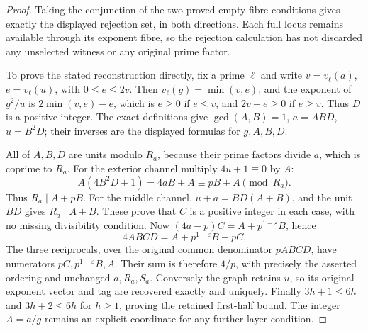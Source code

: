 \begin{proof}
Taking the conjunction of the two proved empty-fibre conditions
gives exactly the displayed rejection set, in both directions.
Each full locus remains available through its exponent fibre,
so the rejection calculation has not discarded any unselected
witness or any original prime factor.

To prove the stated reconstruction directly, fix a prime \(\ell\)
and write \(v=v_\ell(a)\), \(e=v_\ell(u)\), with \(0\le e\le2v\).
Then \(v_\ell(g)=\min(v,e)\), and the exponent of \(g^2/u\)
is \(2\min(v,e)-e\), which is \(e\ge0\) if \(e\le v\),
and \(2v-e\ge0\) if \(e\ge v\). Thus \(D\) is a positive
integer. The exact definitions give \(\gcd(A,B)=1\),
\(a=ABD\), \(u=B^2D\); their inverses are the displayed
formulas for \(g,A,B,D\).

All of \(A,B,D\) are units modulo \(R_a\), because their
prime factors divide \(a\), which is coprime to \(R_a\).
For the exterior channel multiply \(4u+1\equiv0\) by \(A\):
\[
 A(4B^2D+1)=4aB+A\equiv pB+A\pmod{R_a}.
\]
Thus \(R_a\mid A+pB\). For the middle channel,
\(u+a=BD(A+B)\), and the unit \(BD\) gives
\(R_a\mid A+B\). These prove that \(C\) is a positive integer
in each case, with no missing divisibility condition.
Now \((4a-p)C=A+p^{1-\varepsilon}B\), hence
\[
 4ABCD=A+p^{1-\varepsilon}B+pC.
\]
The three reciprocals, over the original common denominator
\(pABCD\), have numerators \(pC,p^{1-\varepsilon}B,A\).
Their sum is therefore \(4/p\), with precisely the asserted
ordering and unchanged \(a,R_a,S_a\). Conversely the graph
retains \(u\), so its original exponent vector and tag are
recovered exactly and uniquely. Finally
\(3h+1\le6h\) and \(3h+2\le6h\) for \(h\ge1\), proving
the retained first-half bound. The integer \(A=a/g\) remains
an explicit coordinate for any further layer condition.
\end{proof}

